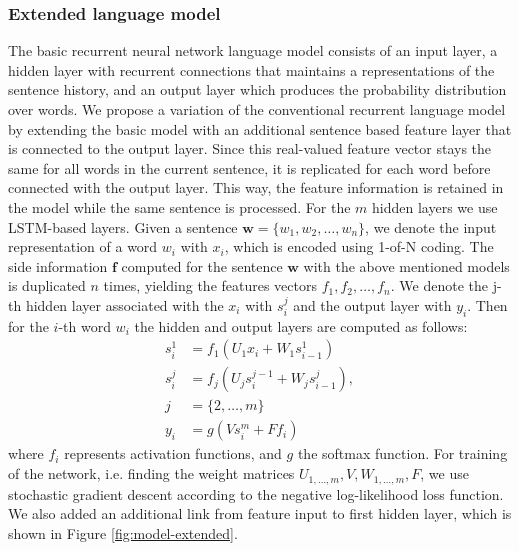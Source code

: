 \documentclass[a4paper]{article}
\begin{document}
\subsubsection{Extended language model}
The basic recurrent neural network language model consists of an input layer, a hidden layer with recurrent connections that maintains a representations of the sentence history, and an output layer which produces the probability distribution over words.
We propose a variation of the conventional recurrent language model by extending the basic model with an additional sentence based feature layer that is connected to the output layer. Since this real-valued feature vector stays the same for all words in the current sentence, it is replicated 
for each word before connected with the output layer. This way, the feature information is retained in the model while the same sentence is processed.
For the $m$ hidden layers we use LSTM-based layers. 
Given a sentence $\textbf{w} = \{w_1, w_2, \ldots, w_n\}$, we denote the input representation of a word $w_i$ with $x_i$, which is encoded using 1-of-N coding. The side information $\textbf{f}$ computed for the sentence $\textbf{w}$ with the above mentioned models is duplicated $n$ times, yielding the features vectors $f_1, f_2, \ldots, f_n$. We denote the j-th hidden layer associated with the  $x_i$ with $s^j_i$ and the output layer with $y_i$. Then for the $i$-th word $w_i$ the hidden and output layers are computed as follows:
\begin{equation}
\begin{aligned}
s^1_i &= f_1(U_1x_i + W_1s^1_{i-1}) \\
s^j_i &= f_j(U_js^{j-1}_i + W_js^j_{i-1}), \\j &= \{2,\ldots,m\} \\
y_i &= g(Vs^m_i + Ff_i)
\end{aligned}
\end{equation}
where $f_i$ represents activation functions, and $g$ the softmax function.
For training of the network, i.e. finding the weight matrices $U_{1,\dots,m}, V, W_{1,\dots,m}, F$, we use stochastic gradient descent according to the negative log-likelihood loss function. We also added an additional link from feature input to first hidden layer, which is shown in Figure \ref{fig:model-extended}.
\end{document}
